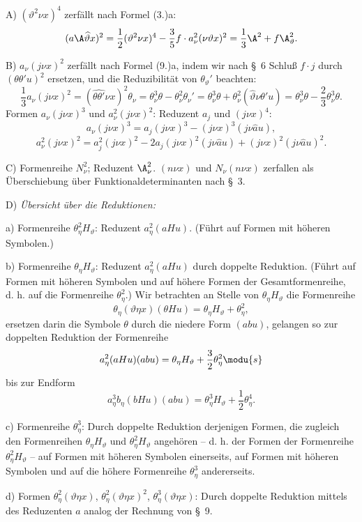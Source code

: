 \noindent A) $(\vartheta^2\nu x)^4$ zerfällt nach Formel (3.)a:
\[
(a\A\widehat{\vartheta}x)^2=\frac12(\vartheta^2\nu x)^4-\frac35 f\cdot a_\nu^2(\nu\vartheta x)^2
=\frac13\A^2+f\A_\vartheta^2.
\]

\noindent B) $a_\nu(j\nu x)^2$ zerfällt nach Formel (9.)a, indem wir nach \S\ 6 Schluß $f\cdot j$ durch $(\theta\theta'u)^2$ ersetzen, und die Reduzibilität von $\theta_\vartheta'$ beachten:
\[
\frac13a_\nu(j\nu x)^2=(\widehat{\theta\theta'}\nu x)^2\theta_\nu
=\theta_\nu^3\theta-\theta_\nu^2\theta_\nu'
=\theta_\nu^3\theta+\theta_\nu^2(\widehat{\vartheta}\nu\theta'u)
=\theta_\nu^3\theta-\frac23\theta_\nu^3\theta.
\]
Formen $a_\nu(j\nu x)^3$ und $a_\nu^2(j\nu x)^2$: Reduzent $a_j$ und $(j\nu x)^4$:
\[
a_\nu(j\nu x)^3=a_j(j\nu x)^3-(j\nu x)^3(j\nu\widehat{a}u),
\]
\[
a_\nu^2(j\nu x)^2=a_j^2(j\nu x)^2-2a_j(j\nu x)^2(j\nu\widehat{a}u)+(j\nu x)^2(j\nu\widehat{a}u)^2.
\]

\noindent C) Formenreihe $N_\nu^2$; Reduzent $\A_\nu^2$.
$(n\nu x)$ und $N_\nu(n\nu x)$ zerfallen als Überschiebung über Funktionaldeterminanten nach \S\ 3.

\noindent D) \emph{Übersicht über die Reduktionen:}

a) Formenreihe $\theta_\eta^2H_\vartheta$: Reduzent $a_\eta^2(aHu)$. (Führt auf Formen mit höheren Symbolen.)

b) Formenreihe $\theta_\eta H_\vartheta$: Reduzent $a_\eta^2(aHu)$ durch doppelte Reduktion.
(Führt auf Formen mit höheren Symbolen und auf höhere Formen der Gesamtformenreihe, d. h. auf die Formenreihe $\theta_\eta^2$.) Wir betrachten an Stelle von $\theta_\eta H_\vartheta$ die Formenreihe
\[
\theta_\eta(\vartheta\eta x)(\theta Hu)=\theta_\eta H_\vartheta+\theta_\eta^2,
\]
ersetzen darin die Symbole $\theta$ durch die niedere Form $(abu)$, gelangen so zur doppelten Reduktion der Formenreihe
\[
a_\eta^2(aHu)(abu)=\theta_\eta H_\vartheta+\frac32\theta_\eta^2\modu{s}
\]
bis zur Endform
\[
a_\eta^3b_\eta(bHu)(abu)=\theta_\eta^3H_\vartheta+\frac12\theta_\eta^4.
\]

c) Formenreihe $\theta_\eta^3$: Durch doppelte Reduktion derjenigen Formen, die zugleich den Formenreihen $\theta_\eta H_\vartheta$ und $\theta_\eta^2H_\vartheta$ angehören -- d. h. der Formen der Formenreihe $\theta_\eta^2H_\vartheta$ -- auf Formen mit höheren Symbolen einerseits, auf Formen mit höheren Symbolen und auf die höhere Formenreihe $\theta_\eta^3$ andererseits.

d) Formen $\theta_\eta^2(\vartheta\eta x)$, $\theta_\eta^2(\vartheta\eta x)^2$, $\theta_\eta^3(\vartheta\eta x)$: Durch doppelte Reduktion mittels des Reduzenten $a$ analog der Rechnung von \S\ 9.

